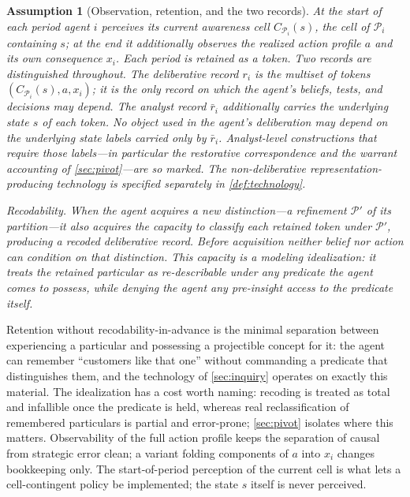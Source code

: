 \documentclass[11pt]{article}
\newtheorem{assumption}{Assumption}[section]
\theoremstyle{definition}
\begin{document}
\begin{assumption}[Observation, retention, and the two records]
\label{ass:observation}
At the start of each period agent $i$ perceives its current awareness cell $C_{\mathcal P_i}(s)$, the cell of $\mathcal P_i$ containing $s$; at the end it additionally observes the realized action profile $a$ and its own consequence $x_i$.
Each period is retained as a token.
Two records are distinguished throughout.
The \emph{deliberative record} $r_i$ is the multiset of tokens $(C_{\mathcal P_i}(s),a,x_i)$; it is the only record on which the agent's beliefs, tests, and decisions may depend.
The \emph{analyst record} $\bar r_i$ additionally carries the underlying state $s$ of each token.
No object used in the agent's deliberation may depend on the underlying state labels carried only by \(\bar r_i\).
Analyst-level constructions that require those labels---in particular the restorative correspondence and the warrant accounting of \cref{sec:pivot}---are so marked.
The non-deliberative representation-producing technology is specified separately in \cref{def:technology}.

\emph{Recodability.}
When the agent acquires a new distinction---a refinement $\mathcal P'$ of its partition---it also acquires the capacity to classify each retained token under $\mathcal P'$, producing a recoded deliberative record.
Before acquisition neither belief nor action can condition on that distinction.
This capacity is a modeling idealization: it treats the retained particular as re-describable under any predicate the agent comes to possess, while denying the agent any pre-insight access to the predicate itself.
\end{assumption}

Retention without recodability-in-advance is the minimal separation between experiencing a particular and possessing a projectible concept for it: the agent can remember ``customers like that one'' without commanding a predicate that distinguishes them, and the technology of \cref{sec:inquiry} operates on exactly this material.
The idealization has a cost worth naming: recoding is treated as total and infallible once the predicate is held, whereas real reclassification of remembered particulars is partial and error-prone; \cref{sec:pivot} isolates where this matters.
Observability of the full action profile keeps the separation of causal from strategic error clean; a variant folding components of $a$ into $x_i$ changes bookkeeping only.
The start-of-period perception of the current cell is what lets a cell-contingent policy be implemented; the state $s$ itself is never perceived.
\end{document}
